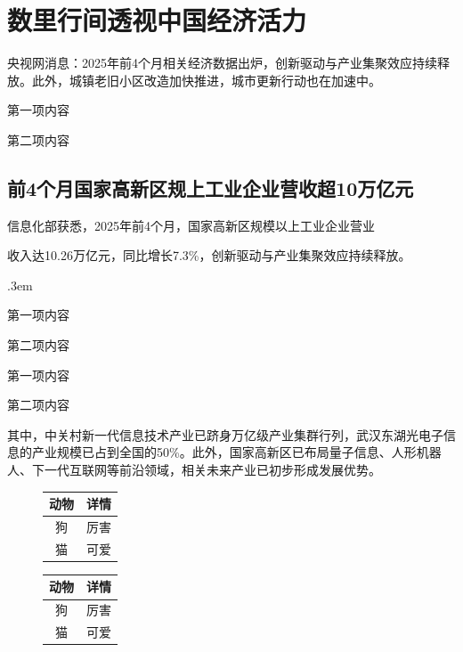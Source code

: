 \section{数里行间透视中国经济活力}
央视网消息：2025年前4个月相关经济数据出炉\cite{jin2001}，创新驱动与产业集聚效应持续释放。此外，城镇老旧小区改造加快推进，城市更新行动也在加速中。\cite{tong1999}
\begin{pul}{2.5em}
	\item 第一项内容
	\item 第二项内容
\end{pul}

\subsection{前4个月国家高新区规上工业企业营收超10万亿元}
信息化部获悉，2025年前4个月，国家高新区规模以上工业企业营业
\pagebreak

\noindent 收入达10.26万亿元，同比增长7.3\%，创新驱动与产业集聚效应持续释放。\cite{riley1990}

\begin{pol}{\arabic*.}{3em}
	\item 第一项内容
	\item 第二项内容
\end{pol}

\begin{ol}
	\item 第一项内容
	\item 第二项内容
\end{ol}
其中，中关村新一代信息技术产业已跻身万亿级产业集群行列\cite{cctvnews}，武汉东湖光电子信息的产业规模已占到全国的50\%。此外，国家高新区已布局量子信息、人形机器人、下一代互联网等前沿领域，相关未来产业已初步形成发展优势。\cite{han1996}

\begin{figure}[htbp!]
	\centering
	\begin{minipage}[b]{.5\textwidth}
		\centering
		\label{tab:t2} %
		\begin{tabular}{cp{6cm}}
			\toprule
			动物 & 详情 \\
			\midrule
			狗    & 厉害 \\
			\addlinespace
			猫    & 可爱\\
			\bottomrule
		\end{tabular}
	\end{minipage}
	\qquad
	\begin{minipage}[b]{.3\textwidth}
		\centering
		
		\label{tab:t3} %
		\begin{tabular}{cc}
			\toprule
			动物 & 详情 \\
			\midrule
			狗    & 厉害 \\
			\addlinespace
			猫    & 可爱\\
			\bottomrule
		\end{tabular}
	\end{minipage}
\end{figure}


